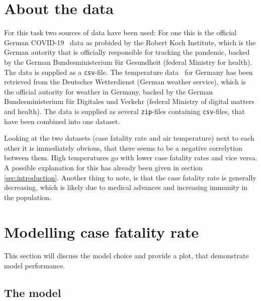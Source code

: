 \documentclass{article}
\begin{document}
\section{About the data}

For this task two sources of data have been used: For one this is the official German COVID-19~\cite{rki_2022} data as probided by the Robert Koch Institute, which is the German autority that is officially responsible for tracking the pandemic, backed by the German Bundesministerium für Gesundheit (federal Ministry for health). The data is supplied as a \texttt{csv}-file. The temperature data~\cite{dwd_2022} for Germany has been retrieved from the Deutscher Wetterdienst (German weather service), which is the official autority for weather in Germany, backed by the German Bundesministerium für Digitales und Verkehr (federal Ministry of digital matters and health). The data is supplied as several \texttt{zip}-files containing \texttt{csv}-files, that have been combined into one dataset.

Looking at the two datasets (case fatality rate and air temperature) next to each other it is immediately obvious, that there seems to be a negative correlytion between them. High temperatures go with lower case fatality rates and vice versa. A possible explanation for this has already been given in section \ref{sec:introduction}. Another thing to note, is that the case fatality rate is generally decreasing, which is likely due to medical advances and increasing immunity in the population.

\section{Modelling case fatality rate}
\label{sec:modelling}

This section will discuss the model choice and provide a plot, that demonstrate model performance.

\subsection{The model}
\end{document}

